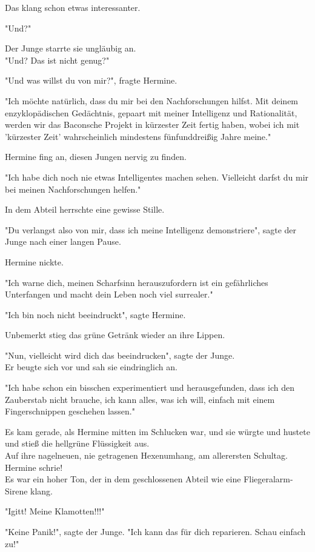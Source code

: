 {Das klang schon etwas interessanter.

"Und?"

Der Junge starrte sie ungläubig an.\\ "Und? Das ist nicht genug?"

"Und was willst du von mir?", fragte Hermine.

"Ich möchte natürlich, dass du mir bei den Nachforschungen hilfst. Mit deinem enzyklopädischen Gedächtnis, gepaart mit meiner Intelligenz und Rationalität, werden wir das Baconsche Projekt in kürzester Zeit fertig haben, wobei ich mit 'kürzester Zeit' wahrscheinlich mindestens fünfunddreißig Jahre meine."

Hermine fing an, diesen Jungen nervig zu finden.

"Ich habe dich noch nie etwas Intelligentes machen sehen. Vielleicht darfst du mir bei meinen Nachforschungen helfen."

In dem Abteil herrschte eine gewisse Stille.

"Du verlangst also von mir, dass ich meine Intelligenz demonstriere", sagte der Junge nach einer langen Pause.

Hermine nickte.

"Ich warne dich, meinen Scharfsinn herauszufordern ist ein gefährliches Unterfangen und macht dein Leben noch viel surrealer."

"Ich bin noch nicht beeindruckt", sagte Hermine.

Unbemerkt stieg das grüne Getränk wieder an ihre Lippen.

"Nun, vielleicht wird dich das beeindrucken", sagte der Junge.\\ Er beugte sich vor und sah sie eindringlich an.

"Ich habe schon ein bisschen experimentiert und herausgefunden, dass ich den Zauberstab nicht brauche, ich kann alles, was ich will, einfach mit einem Fingerschnippen geschehen lassen."

Es kam gerade, als Hermine mitten im Schlucken war, und sie würgte und hustete und stieß die hellgrüne Flüssigkeit aus.\\ Auf ihre nagelneuen, nie getragenen Hexenumhang, am allerersten Schultag. Hermine schrie!\\ Es war ein hoher Ton, der in dem geschlossenen Abteil wie eine Fliegeralarm-Sirene klang.

"Igitt! Meine Klamotten!!!"

"Keine Panik!", sagte der Junge. "Ich kann das für dich reparieren. Schau einfach zu!"

}
